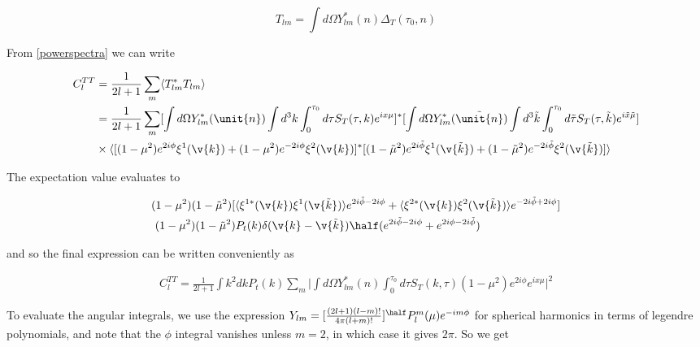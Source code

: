 \begin{equation}
T_{lm} = \int d\Omega Y_{lm}^*(\unit{n})\Delta_T(\tau_0,\unit{n})
\end{equation}

From \ref{powerspectra} we can write 

\begin{equation}\begin{split}
C_l^{TT} &= \frac{1}{2l+1}\sum_m \langle T_{lm}^*T_{lm} \rangle \\
&= \frac{1}{2l+1} \sum_m [\int d\Omega Y_{lm}^*(\unit{n})\int d^3k\int_0^{\tau_0}d\tau S_T(\tau,k)e^{ix\mu}]^*
[\int d\Omega Y_{lm}^*(\tilde{\unit{n}})\int d^3\tilde{k}\int_0^{\tau_0}d\tilde{\tau}S_T(\tau,\tilde{k})e^{i\tilde{x}\tilde{\mu}}]\\
&\times
\langle [(1-\mu^2) e^{2i\phi} \xi^1(\v{k})+(1-\mu^2) e^{-2i\phi} \xi^2(\v{k})]^*[(1-\tilde{\mu}^2) e^{2i\tilde{\phi}} \xi^1(\v{\tilde{k}})+(1-\tilde{\mu}^2) e^{-2i\tilde{\phi}} \xi^2(\v{\tilde{k}})] \rangle
\end{split}\end{equation}

The expectation value evaluates to

\begin{equation}\begin{split}
&(1-\mu^2)(1-\tilde{\mu}^2)[\langle\xi^{1*}(\v{k})\xi^1(\v{\tilde{k}})\rangle e^{2i\tilde{\phi}-2i\phi}+\langle\xi^{2*}(\v{k})\xi^2(\v{\tilde{k}})\rangle e^{-2i\tilde{\phi}+2i\phi}]\\
&~ (1-\mu^2)(1-\tilde{\mu}^2)P_t(k)\delta(\v{k}-\v{\tilde{k}})\half(e^{2i\tilde{\phi}-2i\phi}+e^{2i\phi-2i\tilde{\phi}})
\end{split}\end{equation}

and so the final expression can be written conveniently as 

\begin{equation}\begin{split}
C_l^{TT} = \frac{1}{2l+1} \int k^2 dk P_t(k) \sum_m \bigg| \int d\Omega Y^*_{lm}(\unit{n}) \int_0^{\tau_0} d\tau  S_T(k,\tau)(1-\mu^2)e^{2i\phi}e^{ix\mu} \bigg|^2
\end{split}\end{equation}

To evaluate the angular integrals, we use the expression $Y_{lm} = [\frac{(2l+1)(l-m)!}{4\pi(l+m)!}]^\half P_l^m(\mu)e^{-im\phi}$ for spherical harmonics in terms of legendre polynomials, and note that the $\phi$ integral vanishes unless $m=2$, in which case it gives $2\pi$. So we get 

